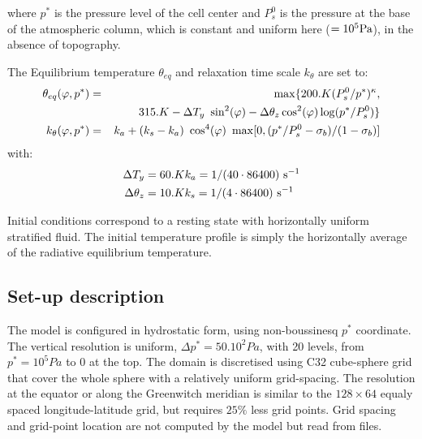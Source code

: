 where $p^*$ is the pressure level of the cell center 
and $P^{0}_{s}$ is the pressure at the base of the atmospheric column,
which is constant and uniform here ($= 10^5 {\rm Pa}$), in the absence 
of topography.

The Equilibrium temperature $\theta_{eq}$ and relaxation time scale $k_{\theta}$ 
are set to:
\begin{eqnarray}
\label{eq:eg-hs-define_Teq}
\theta_{eq}(\varphi,p^*) & = & \max \{ 200.K (P^{0}_{s}/p^*)^\kappa,\\
\nonumber
& & \hspace{8mm} 315.K - \Delta T_y~\sin^2(\varphi) 
  - \Delta \theta_z \cos^2(\varphi) \log(p^*/P^{0}_s) \}
\\
\label{eq:eg-hs-define_kT}
k_{\theta}(\varphi,p^*) & = &
k_a + (k_s -k_a)~\cos^4(\varphi)~\max[0,(p^*/P^{0}_{s}-\sigma_{b})/(1-\sigma_{b})]
\end{eqnarray}
with:
\begin{eqnarray*}
 \Delta T_y = 60.K & k_a = 1/(40 \cdot 86400) ~{\rm s}^{-1}\\
\Delta \theta_z = 10.K & k_s = 1/(4 \cdot 86400) ~{\rm s}^{-1}
\end{eqnarray*}

Initial conditions correspond to a resting state with horizontally uniform 
stratified fluid. The initial temperature profile is simply the 
horizontally average of the radiative equilibrium temperature.

\subsection{Set-up description}

The model is configured in hydrostatic form, using non-boussinesq
$p^*$ coordinate.
The vertical resolution is uniform, $\Delta p^* = 50.10^2 Pa$,
with 20 levels, from $p^*=10^5 Pa$ to $0$ at the top.
The domain is discretised using C32 cube-sphere grid \cite[]{adcroft:04b}
that cover the whole sphere with a relatively uniform grid-spacing.
The resolution at the equator or along the Greenwitch meridian
is similar to the $128 \times 64$ equaly spaced longitude-latitude grid,
but requires $25\%$ less grid points.
Grid spacing and grid-point location are not computed by the model but
read from files.

